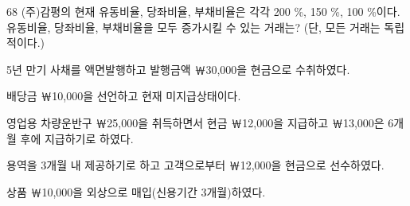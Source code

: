 \begin{question}{68}
(주)감평의 현재 유동비율, 당좌비율, 부채비율은 각각 200 \%, 150 \%, 100 \%이다. 유동비율, 당좌비율, 부채비율을 모두 증가시킬 수 있는 거래는? (단, 모든 거래는 독립적이다.)
\begin{choices}
  \item 5년 만기 사채를 액면발행하고 발행금액 ￦30,000을 현금으로 수취하였다.
  \item 배당금 ￦10,000을 선언하고 현재 미지급상태이다.
  \item 영업용 차량운반구 ￦25,000을 취득하면서 현금 ￦12,000을 지급하고 ￦13,000은 6개월 후에 지급하기로 하였다.
  \item 용역을 3개월 내 제공하기로 하고 고객으로부터 ￦12,000을 현금으로 선수하였다.
  \item 상품 ￦10,000을 외상으로 매입(신용기간 3개월)하였다.
\end{choices}
\end{question}
